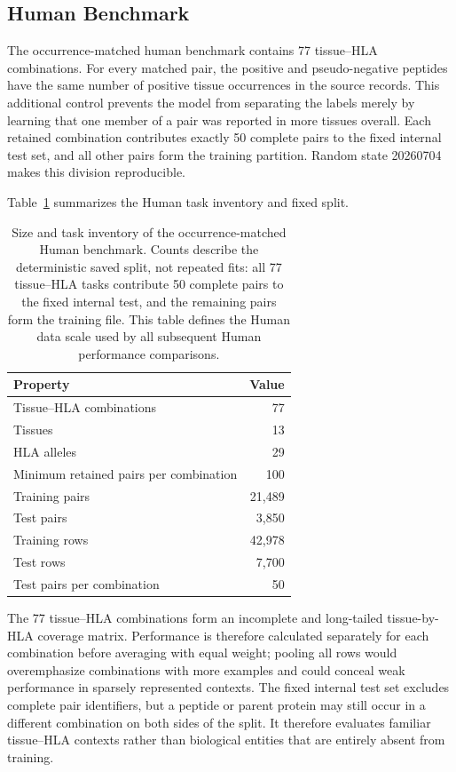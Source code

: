 \documentclass[webpdf,modern,large,nocrop,noinfo]{oup-authoring-template}
\newcommand{\plainHLA}{HLA}
\begin{document}
\subsection{Human Benchmark}
\label{sec:human-benchmark}

The occurrence-matched human benchmark contains 77 tissue--HLA combinations. For every matched pair, the positive and pseudo-negative peptides have the same number of positive tissue occurrences in the source records. This additional control prevents the model from separating the labels merely by learning that one member of a pair was reported in more tissues overall. Each retained combination contributes exactly 50 complete pairs to the fixed internal test set, and all other pairs form the training partition. Random state 20260704 makes this division reproducible.

Table~\ref{tab:human-benchmark-stats} summarizes the Human task inventory and fixed split.

\begin{table}[tbp]
\centering
\caption{Size and task inventory of the occurrence-matched Human benchmark. Counts describe the deterministic saved split, not repeated fits: all 77 tissue--HLA tasks contribute 50 complete pairs to the fixed internal test, and the remaining pairs form the training file. This table defines the Human data scale used by all subsequent Human performance comparisons.}
\label{tab:human-benchmark-stats}
\small
\begin{tabularx}{\columnwidth}{@{}>{\raggedright\arraybackslash}Xr@{}}
\toprule
Property & Value \\
\midrule
Tissue--HLA combinations & 77 \\
Tissues & 13 \\
\plainHLA{} alleles & 29 \\
Minimum retained pairs per combination & 100 \\
Training pairs & 21,489 \\
Test pairs & 3,850 \\
Training rows & 42,978 \\
Test rows & 7,700 \\
Test pairs per combination & 50 \\
\bottomrule
\end{tabularx}
\end{table}

The 77 tissue--\plainHLA{} combinations form an incomplete and long-tailed tissue-by-HLA coverage matrix. Performance is therefore calculated separately for each combination before averaging with equal weight; pooling all rows would overemphasize combinations with more examples and could conceal weak performance in sparsely represented contexts. The fixed internal test set excludes complete pair identifiers, but a peptide or parent protein may still occur in a different combination on both sides of the split. It therefore evaluates familiar tissue--HLA contexts rather than biological entities that are entirely absent from training.
\end{document}
